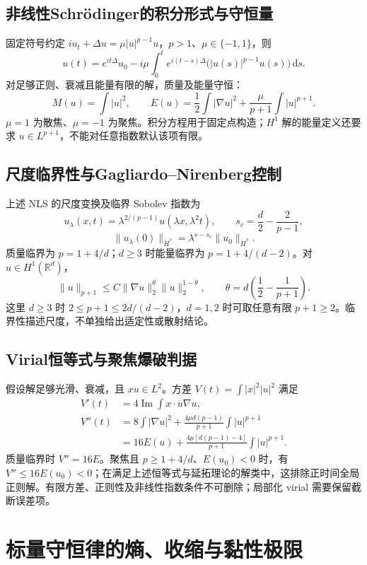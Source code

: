 \documentclass[../main.tex]{subfiles}
\begin{document}
\subsection{非线性Schrödinger的积分形式与守恒量}
固定符号约定 $iu_t+\Delta u=\mu|u|^{p-1}u$，$p>1$、$\mu\in\{-1,1\}$，则
\[
u(t)=e^{it\Delta}u_0-i\mu\int_0^te^{i(t-s)\Delta}
\bigl(|u(s)|^{p-1}u(s)\bigr)\,\mathrm ds.
\]
对足够正则、衰减且能量有限的解，质量及能量守恒：
\[
M(u)=\int|u|^2,\qquad
E(u)=\frac12\int|\nabla u|^2+\frac\mu{p+1}\int|u|^{p+1}.
\]
$\mu=1$ 为散焦、$\mu=-1$ 为聚焦。积分方程用于固定点构造；$H^1$ 解的能量定义还要求 $u\in L^{p+1}$，不能对任意指数默认该项有限。
\subsection{尺度临界性与Gagliardo--Nirenberg控制}
上述 NLS 的尺度变换及临界 Sobolev 指数为
\[
u_\lambda(x,t)=\lambda^{2/(p-1)}u(\lambda x,\lambda^2t),\qquad
s_c=\frac d2-\frac2{p-1},
\]
\[
\|u_\lambda(0)\|_{\dot H^s}=\lambda^{s-s_c}\|u_0\|_{\dot H^s}.
\]
质量临界为 $p=1+4/d$；$d\ge3$ 时能量临界为 $p=1+4/(d-2)$。对 $u\in H^1(\mathbb R^d)$，
\[
\|u\|_{p+1}\le C\|\nabla u\|_2^\theta\|u\|_2^{1-\theta},\qquad
\theta=d\left(\frac12-\frac1{p+1}\right).
\]
这里 $d\ge3$ 时 $2\le p+1\le2d/(d-2)$，$d=1,2$ 时可取任意有限 $p+1\ge2$。临界性描述尺度，不单独给出适定性或散射结论。
\subsection{Virial恒等式与聚焦爆破判据}
假设解足够光滑、衰减，且 $xu\in L^2$。方差 $V(t)=\int|x|^2|u|^2$ 满足
\begin{align*}
V'(t)&=4\operatorname{Im}\int x\cdot\overline u\nabla u,\\
V''(t)&=8\int|\nabla u|^2
+\frac{4\mu d(p-1)}{p+1}\int|u|^{p+1}\\
&=16E(u)+\frac{4\mu[d(p-1)-4]}{p+1}\int|u|^{p+1}.
\end{align*}
质量临界时 $V''=16E$。聚焦且 $p\ge1+4/d$、$E(u_0)<0$ 时，有 $V''\le16E(u_0)<0$；在满足上述恒等式与延拓理论的解类中，这排除正时间全局正则解。有限方差、正则性及非线性指数条件不可删除；局部化 virial 需要保留截断误差项。

\section{标量守恒律的熵、收缩与黏性极限}
\end{document}
